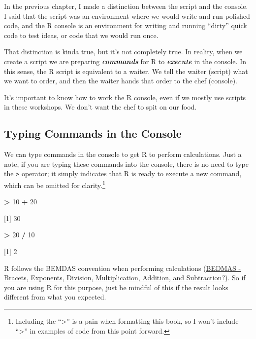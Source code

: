 \documentclass[
]{book}
\newenvironment{Shaded}{\begin{snugshade}}{\end{snugshade}}
\newcommand{\DecValTok}[1]{\textcolor[rgb]{0.00,0.00,0.81}{#1}}
\newcommand{\NormalTok}[1]{#1}
\newcommand{\SpecialCharTok}[1]{\textcolor[rgb]{0.81,0.36,0.00}{\textbf{#1}}}
\begin{document}
In the previous chapter, I made a distinction between the script and the console. I said that the script was an environment where we would write and run polished code, and the R console is an environment for writing and running ``dirty'' quick code to test ideas, or code that we would run once.

That distinction is kinda true, but it's not completely true. In reality, when we create a script we are preparing \textbf{\emph{commands}} for R to \textbf{\emph{execute}} in the console. In this sense, the R script is equivalent to a waiter. We tell the waiter (script) what we want to order, and then the waiter hands that order to the chef (console).

It's important to know how to work the R console, even if we mostly use scripts in these workshops. We don't want the chef to spit on our food.

\subsection{Typing Commands in the Console}\label{typing-commands-in-the-console}

We can type commands in the console to get R to perform calculations. Just a note, if you are typing these commands into the console, there is no need to type the \texttt{\textgreater{}} operator; it simply indicates that R is ready to execute a new command, which can be omitted for clarity.\footnote{Including the ``\textgreater{}'' is a pain when formatting this book, so I won't include ``\textgreater{}'' in examples of code from this point forward.}

\begin{Shaded}
\begin{Highlighting}[]
\SpecialCharTok{\textgreater{}} \DecValTok{10} \SpecialCharTok{+} \DecValTok{20}

\NormalTok{[}\DecValTok{1}\NormalTok{] }\DecValTok{30}
\end{Highlighting}
\end{Shaded}

\begin{Shaded}
\begin{Highlighting}[]
\SpecialCharTok{\textgreater{}} \DecValTok{20} \SpecialCharTok{/} \DecValTok{10}

\NormalTok{[}\DecValTok{1}\NormalTok{] }\DecValTok{2}
\end{Highlighting}
\end{Shaded}

R follows the BEMDAS convention when performing calculations (\href{https://www.tes.com/en-ie/teaching-resource/bidmas-bodmas-bedmas-bimdas-pemdas-permdas-11154272\#:~:text=\%E2\%80\%A2\%20BIMDAS\%20\%2D\%20Brackets\%2C\%20Indices\%2C,Multiplication\%2C\%20Division\%2C\%20Addition\%2C\%20Subtraction}{BEDMAS - Bracets, Exponents, Division, Multiplication, Addition, and Subtraction?}). So if you are using R for this purpose, just be mindful of this if the result looks different from what you expected.
\end{document}
